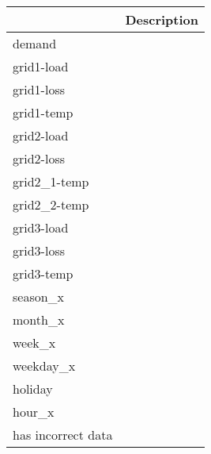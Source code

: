 \begin{tabular}{ll}
\toprule
{} & Description \\
\midrule
demand             &             \\
grid1-load         &             \\
grid1-loss         &             \\
grid1-temp         &             \\
grid2-load         &             \\
grid2-loss         &             \\
grid2\_1-temp       &             \\
grid2\_2-temp       &             \\
grid3-load         &             \\
grid3-loss         &             \\
grid3-temp         &             \\
season\_x           &             \\
month\_x            &             \\
week\_x             &             \\
weekday\_x          &             \\
holiday            &             \\
hour\_x             &             \\
has incorrect data &             \\
\bottomrule
\end{tabular}
